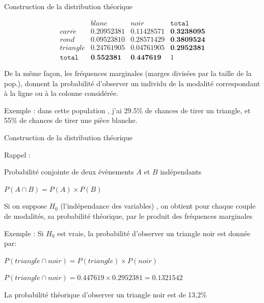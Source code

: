 \documentclass{beamer}
\begin{document}
\begin{frame}{ Construction de la distribution théorique}


$$\begin{array}{c|c|c|c}
   & blanc & noir & \texttt{total}\\ 
   \hline
carr\acute{e} &  0.20952381&  0.11428571 &  \textbf{0.3238095}\\ 
  \hline
  rond &    0.09523810 & 0.28571429 & \textbf{0.3809524}  \\ 
    \hline
  triangle & 0.24761905 & 0.04761905 &   \textbf{0.2952381}\\
  \hline
  \texttt{total} &  \textbf{0.552381} & \textbf{0.447619} & 1
  \end{array}$$


De la même façon, les \alert{fréquences marginales} (marges divisées par la taille de la pop.), donnent la \alert{probabilité} d'observer un individu de la modalité correspondant à la ligne ou à la colonne considérée.

\begin{tiny}
\begin{spacing}{0.75}
Exemple : dans cette population , j'ai 29.5\% de chances de tirer un triangle, et 55\% de chances de tirer une pièce blanche.
\end{spacing}
\end{tiny}


\end{frame}


\begin{frame}{ Construction de la distribution théorique}

Rappel : 

Probabilité conjointe de deux évènements $A$ et $B$ \alert{indépendants}  


$P(A \cap B) = P(A) \times P(B)$

\vspace{0.6cm}
Si on suppose $H_0$ (l'indépendance des variables) , on obtient pour chaque couple de modalités, sa probabilité \alert{théorique}, par le \alert{produit des fréquences marginales }


\vspace{0.6cm}
\begin{tiny}
\begin{spacing}{0.85}
Exemple :  Si $H_0$ est vraie, la probabilité d'observer un triangle noir est donnée par: 

$P(triangle \cap noir) = P(triangle) \times P(noir)$

$P(triangle \cap noir) =0.447619 \times 0.2952381  = 0.1321542$

La probabilité théorique d'observer un triangle noir est de 13,2\%  
\end{spacing}
\end{tiny}

\end{frame}
\end{document}
